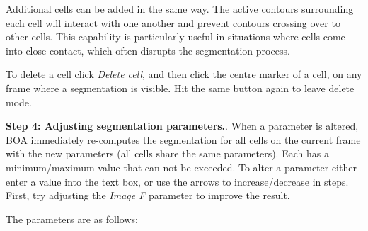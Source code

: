 \documentclass[a4paper,12pt]{article}
\begin{document}
Additional cells can be added in the same way.   The active contours surrounding each cell will interact with one another and prevent
contours crossing over to other cells.  This capability is particularly useful in situations where cells come into close contact, 
which often disrupts the segmentation process.

To delete a cell click \textit{Delete cell}, and then click the centre marker of a cell, on any frame where a segmentation is visible.  Hit the same 
button again to leave delete mode.


\textbf{Step 4: Adjusting segmentation parameters.}.  When a parameter is altered, BOA immediately re-computes the segmentation
for all cells on the current frame with the new parameters (all cells share the same parameters).  Each has a minimum/maximum
value that can not be exceeded.  To alter a parameter either enter a value into the text box, or use the arrows to increase/decrease in steps.
First, try adjusting the \textit{Image F} parameter to improve the result.

The parameters are as follows:
\end{document}
